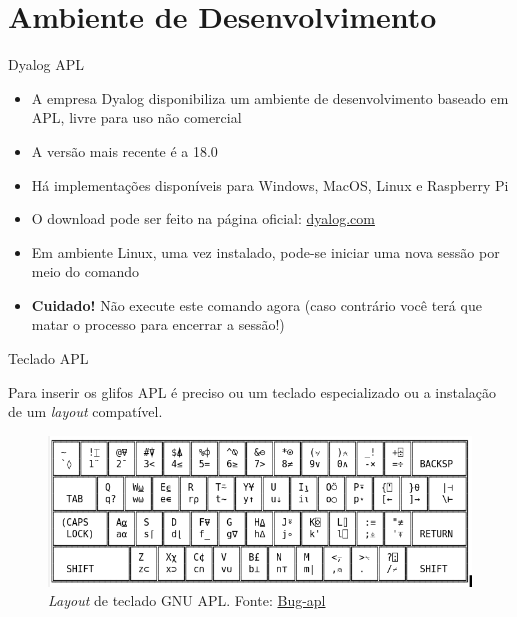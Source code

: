 \section{Ambiente de Desenvolvimento}

\begin{frame}[fragile]{Dyalog APL}

    \begin{itemize}
        \item A empresa Dyalog disponibiliza um ambiente de desenvolvimento baseado em APL, livre para uso não comercial
        \pause

        \item A versão mais recente é a 18.0
        \pause

        \item Há implementações disponíveis para Windows, MacOS, Linux e Raspberry Pi
        \pause
 
        \item O download pode ser feito na página oficial: \href{dyalog.com}{dyalog.com}
        \pause

        \item Em ambiente Linux, uma vez instalado, pode-se iniciar uma nova sessão por meio do
            comando

        \pause

        \item \textbf{Cuidado!} Não execute este comando agora (caso contrário você terá que
            matar o processo para encerrar a sessão!)

    \end{itemize}

\end{frame}

\begin{frame}[fragile]{Teclado APL}

    Para inserir os glifos APL é preciso ou um teclado especializado ou a instalação de um \textit{layout} compatível.
        \pause

    \begin{figure}
        \centering
        \includegraphics[scale=0.5]{figs/keyboard.png}

        \caption{\textit{Layout} de teclado GNU APL. Fonte: \href{https://lists.gnu.org/archive/html/bug-apl/2014-06/msg00261.html}{Bug-apl}}
    \end{figure}

\end{frame}

